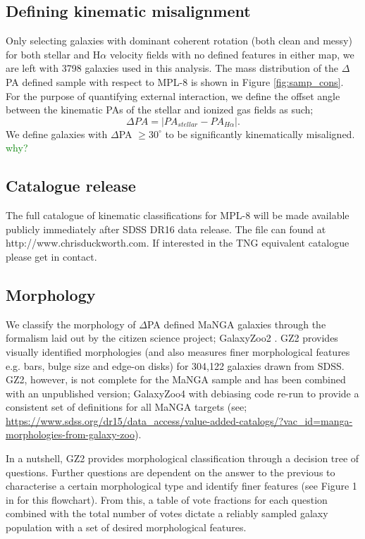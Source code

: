 \documentclass[fleqn,usenatbib]{mnras}
\newcommand{\green}[1]{{\textcolor{green}{#1}}}
\begin{document}
\subsection{Defining kinematic misalignment} \label{sec:def_kin_mis}
Only selecting galaxies with dominant coherent rotation (both clean and messy) for both stellar and H$\alpha$ velocity fields with no defined features in either map, we are left with 3798 galaxies used in this analysis. The mass distribution of the $\Delta$PA defined sample with respect to MPL-8 is shown in Figure \ref{fig:samp_cons}. For the purpose of quantifying external interaction, we define the offset angle between the kinematic PAs of the stellar and ionized gas fields as such; 
\begin{equation} \label{eq:delPA}
\Delta PA = |PA_{stellar} - PA_{H\alpha}|. 
\end{equation}
We define galaxies with $\Delta$PA $\geq 30^{\circ}$ to be significantly kinematically misaligned. \green{why?}

\subsection{Catalogue release}
The full catalogue of kinematic classifications for MPL-8 will be made available publicly immediately after SDSS DR16 data release. The file can found at http://www.chrisduckworth.com. If interested in the TNG equivalent catalogue please get in contact.

\subsection{Morphology} \label{sec:morph_def}
We classify the morphology of $\Delta$PA defined MaNGA galaxies through the formalism laid out by the citizen science project; GalaxyZoo2 \citep[GZ2;][]{willett2013}. GZ2 provides visually identified morphologies (and also measures finer morphological features e.g. bars, bulge size and edge-on disks) for 304,122 galaxies drawn from SDSS. GZ2, however, is not complete for the MaNGA sample and has been combined with an unpublished version; GalaxyZoo4 with debiasing code re-run to provide a consistent set of definitions for all MaNGA targets (see; \url{https://www.sdss.org/dr15/data_access/value-added-catalogs/?vac_id=manga-morphologies-from-galaxy-zoo}). 

In a nutshell, GZ2 provides morphological classification through a decision tree of questions. Further questions are dependent on the answer to the previous to characterise a certain morphological type and identify finer features (see Figure 1 in \citep{willett2013} for this flowchart). From this, a table of vote fractions for each question combined with the total number of votes dictate a reliably sampled galaxy population with a set of desired morphological features. 
\end{document}
